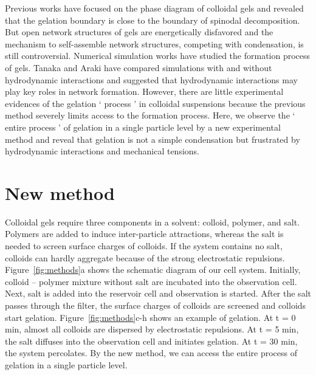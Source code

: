 Previous works have focused on the phase diagram of colloidal gels and revealed that the gelation boundary is close to the boundary of spinodal decomposition.
But open network structures of gels are energetically disfavored and the mechanism to self-assemble network structures, competing with condensation, is still controversial.
Numerical simulation works have studied the formation process of gels.
Tanaka and Araki have compared simulations with and without hydrodynamic interactions and suggested that hydrodynamic interactions may play key roles in network formation.
However, there are little experimental evidences of the gelation ‘ process ’ in colloidal suspensions because the previous method severely limits access to the formation process.
Here, we observe the ‘ entire process ’ of gelation in a single particle level by a new experimental method and reveal that gelation is not a simple condensation but frustrated by hydrodynamic interactions and mechanical tensions.



\section{New method} %
Colloidal gels require three components in a solvent: colloid, polymer, and salt.
Polymers are added to induce inter-particle attractions, whereas the salt is needed to screen surface charges of colloids.
If the system contains no salt, colloids can hardly aggregate because of the strong electrostatic repulsions.
Figure~\ref{fig:methods}a shows the schematic diagram of our cell system.
Initially, colloid – polymer mixture without salt are incubated into the observation cell.
Next, salt is added into the reservoir cell and observation is started.
After the salt passes through the filter, the surface charges of colloids are screened and colloids start gelation.
Figure~\ref{fig:methods}c-h shows an example of gelation.
At t = 0 min, almost all colloids are dispersed by electrostatic repulsions.
At t = 5 min, the salt diffuses into the observation cell and initiates gelation.
At t = 30 min, the system percolates.
By the new method, we can access the entire process of gelation in a single particle level.





